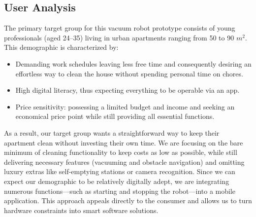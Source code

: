 \subsection{User Analysis}
The primary target group for this vacuum robot prototype consists of young
professionals (aged 24–35) living in urban apartments ranging from 50 to 90 $m^2$. This
demographic is characterized by:

\begin{itemize}
    \item Demanding work schedules leaving less free time and consequently desiring an effortless way to clean the house without spending personal time on chores.
    \item High digital literacy, thus expecting everything to be operable via an app.
    \item Price sensitivity: possessing a limited budget and income and seeking an economical price point while still providing all essential functions.
\end{itemize}

As a result, our target group wants a straightforward way to keep their apartment clean
without investing their own time.
We are focusing on the bare minimum of cleaning functionality to keep costs as low as
possible, while still delivering necessary features (vacuuming and obstacle navigation)
and omitting luxury extras like self-emptying stations or camera recognition.
Since we can expect our demographic to be relatively digitally adept, we are integrating
numerous functions—such as starting and stopping the robot—into a mobile
application. This approach appeals directly to the consumer and allows us to turn
hardware constraints into smart software solutions.